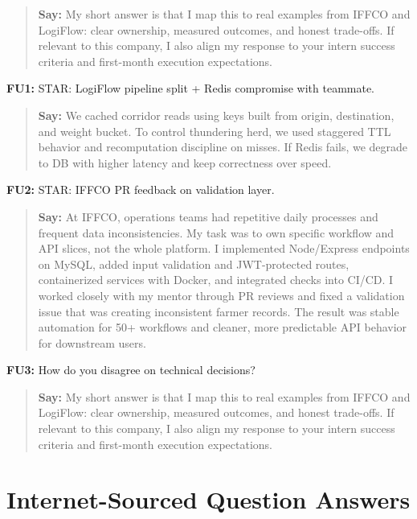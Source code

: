 \documentclass[9pt,a4paper]{article}
\begin{document}
\begin{quote}\small\textbf{Say:} My short answer is that I map this to real examples from IFFCO and LogiFlow: clear ownership, measured outcomes, and honest trade-offs. If relevant to this company, I also align my response to your intern success criteria and first-month execution expectations.\end{quote}
\vspace{2mm}
\textbf{FU1:} STAR: LogiFlow pipeline split + Redis compromise with teammate.

\begin{quote}\small\textbf{Say:} We cached corridor reads using keys built from origin, destination, and weight bucket. To control thundering herd, we used staggered TTL behavior and recomputation discipline on misses. If Redis fails, we degrade to DB with higher latency and keep correctness over speed.\end{quote}
\vspace{2mm}
\textbf{FU2:} STAR: IFFCO PR feedback on validation layer.

\begin{quote}\small\textbf{Say:} At IFFCO, operations teams had repetitive daily processes and frequent data inconsistencies. My task was to own specific workflow and API slices, not the whole platform. I implemented Node/Express endpoints on MySQL, added input validation and JWT-protected routes, containerized services with Docker, and integrated checks into CI/CD. I worked closely with my mentor through PR reviews and fixed a validation issue that was creating inconsistent farmer records. The result was stable automation for 50+ workflows and cleaner, more predictable API behavior for downstream users.\end{quote}
\vspace{2mm}
\textbf{FU3:} How do you disagree on technical decisions?

\begin{quote}\small\textbf{Say:} My short answer is that I map this to real examples from IFFCO and LogiFlow: clear ownership, measured outcomes, and honest trade-offs. If relevant to this company, I also align my response to your intern success criteria and first-month execution expectations.\end{quote}
\vspace{2mm}
\newpage\section{Internet-Sourced Question Answers}
\end{document}
